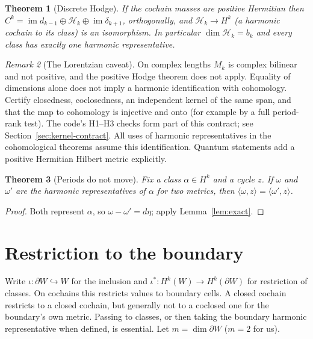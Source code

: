 \documentclass[11pt]{article}
\newtheorem{theorem}{Theorem}[section]
\theoremstyle{definition}
\theoremstyle{remark}
\newtheorem{remark}[theorem]{Remark}
\newcommand{\im}{\operatorname{im}}
\newcommand{\Hgroup}{\mathcal{H}}
\begin{document}
\begin{theorem}[Discrete Hodge]\label{thm:hodge}
If the cochain masses are positive Hermitian then $C^k = \im d_{k-1} \oplus \Hgroup_k \oplus
\im \delta_{k+1}$, orthogonally, and $\Hgroup_k \to H^k$ (a harmonic cochain
to its class) is an isomorphism. In particular $\dim \Hgroup_k = b_k$ and
every class has exactly one harmonic representative.
\end{theorem}

\begin{remark}[The Lorentzian caveat]
On complex lengths $M_k$ is complex bilinear and not positive, and
the positive Hodge theorem does not apply. Equality of dimensions alone
does not imply a harmonic identification with cohomology. Certify closedness,
coclosedness, an independent kernel of the same span, and that the map to
cohomology is injective and onto (for example by a full period-rank test).
The code's H1--H3 checks form part of this contract; see
Section~\ref{sec:kernel-contract}. All uses of harmonic representatives in
the cohomological theorems assume this identification. Quantum statements
add a positive Hermitian Hilbert metric explicitly.
\end{remark}

\begin{theorem}[Periods do not move]\label{thm:invariance}
Fix a class $\alpha \in H^k$ and a cycle $z$. If $\omega$ and $\omega'$ are
the harmonic representatives of $\alpha$ for two metrics, then
$\langle \omega, z\rangle = \langle \omega', z\rangle$.
\end{theorem}
\begin{proof}
Both represent $\alpha$, so $\omega - \omega' = d\eta$; apply
Lemma~\ref{lem:exact}.
\end{proof}

\section{Restriction to the boundary}\label{sec:restriction}

Write $\iota: \partial W \hookrightarrow W$ for the inclusion and
$\iota^*: H^k(W) \to H^k(\partial W)$ for restriction of classes. On
cochains this restricts values to boundary cells. A closed cochain restricts
to a closed cochain, but generally not to a coclosed one for the boundary's
own metric. Passing to classes, or then taking the boundary harmonic
representative when defined, is essential. Let $m = \dim \partial W$
($m = 2$ for us).
\end{document}
